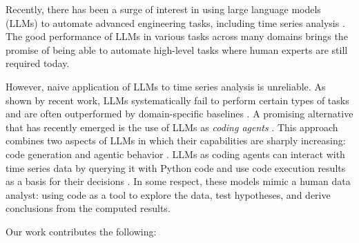 \documentclass[11pt]{article}
\renewcommand{\cite}{\citep}
\begin{document}
Recently, there has been a surge of interest in using large language models (LLMs) to automate advanced engineering tasks, including time series analysis \cite{jin2024llms,zhang2024largea,heesch2025evaluating}. The good performance of LLMs in various tasks across many domains brings the promise of being able to automate high-level tasks where human experts are still required today. 


However, naive application of LLMs to time series analysis is unreliable. As shown by recent work, LLMs systematically fail to perform certain types of tasks and are often outperformed by domain-specific baselines \cite{tan2024language,fons2024evaluatinga,arai2025evaluating,park2025revisiting}. 
A promising alternative that has recently emerged is the use of LLMs as \textit{coding agents} \cite{dong2025survey}. This approach combines two aspects of LLMs in which their capabilities are sharply increasing: code generation and agentic behavior \cite{jimenez2023swe,wang2024survey,mohammadi2025evaluation}. LLMs as coding agents can interact with time series data by querying it with Python code and use code execution results as a basis for their decisions \cite{ye2025when}. 
In some respect, these models mimic a human data analyst: using code as a tool to explore the data, test hypotheses, and derive conclusions from the computed results. 

Our work contributes the following:
\end{document}
